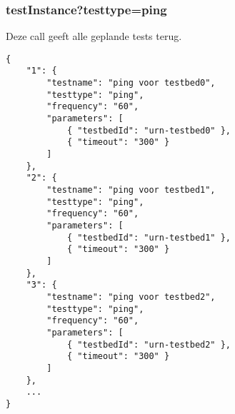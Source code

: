 \subsubsection{testInstance?testtype=ping}
Deze call geeft alle geplande tests terug.
\begin{verbatim}
{
    "1": {
        "testname": "ping voor testbed0",
        "testtype": "ping",
        "frequency": "60",
        "parameters": [
            { "testbedId": "urn-testbed0" },
            { "timeout": "300" }
        ]
    },
    "2": {
        "testname": "ping voor testbed1",
        "testtype": "ping",
        "frequency": "60",
        "parameters": [
            { "testbedId": "urn-testbed1" },
            { "timeout": "300" }
        ]
    },
    "3": {
        "testname": "ping voor testbed2",
        "testtype": "ping",
        "frequency": "60",
        "parameters": [
            { "testbedId": "urn-testbed2" },
            { "timeout": "300" }
        ]
    },
    ...
}
\end{verbatim}